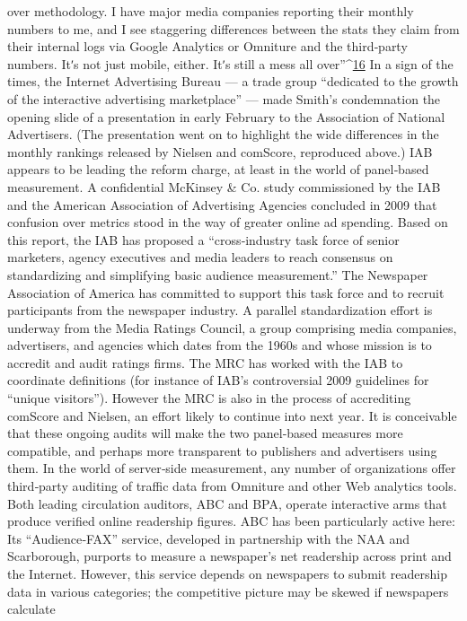 over methodology. I have major media companies reporting their
monthly numbers to me, and I see staggering differences between
the stats they claim from their internal logs via Google Analytics or
Omniture and the third‐party numbers. Itʹs not just mobile, either.
Itʹs still a mess all over''^{\href{#endnotes}{16}}
In a sign of the times, the Internet Advertising Bureau — a trade group
``dedicated to the growth of the interactive advertising marketplace'' —
made Smith’s condemnation the opening slide of a presentation in early
February to the Association of National Advertisers. (The presentation
went on to highlight the wide differences in the monthly rankings
released by Nielsen and comScore, reproduced above.)
IAB appears to be leading the reform charge, at least in the world of
panel‐based measurement. A confidential McKinsey & Co. study
commissioned by the IAB and the American Association of Advertising
Agencies concluded in 2009 that confusion over metrics stood in the way
of greater online ad spending. Based on this report, the IAB has proposed
a ``cross‐industry task force of senior marketers, agency executives and
media leaders to reach consensus on standardizing and simplifying basic
audience measurement.'' The Newspaper Association of America has
committed to support this task force and to recruit participants from the
newspaper industry.
A parallel standardization effort is underway from the Media Ratings
Council, a group comprising media companies, advertisers, and agencies
which dates from the 1960s and whose mission is to accredit and audit
ratings firms. The MRC has worked with the IAB to coordinate definitions
(for instance of IAB’s controversial 2009 guidelines for ``unique visitors'').
However the MRC is also in the process of accrediting comScore and
Nielsen, an effort likely to continue into next year. It is conceivable that
these ongoing audits will make the two panel‐based measures more
compatible, and perhaps more transparent to publishers and advertisers
using them.
In the world of server‐side measurement, any number of organizations
offer third‐party auditing of traffic data from Omniture and other Web
analytics tools. Both leading circulation auditors, ABC and BPA, operate
interactive arms that produce verified online readership figures. ABC has
been particularly active here: Its ``Audience‐FAX'' service, developed in
partnership with the NAA and Scarborough, purports to measure a
newspaper’s net readership across print and the Internet. However, this
service depends on newspapers to submit readership data in various
categories; the competitive picture may be skewed if newspapers calculate
